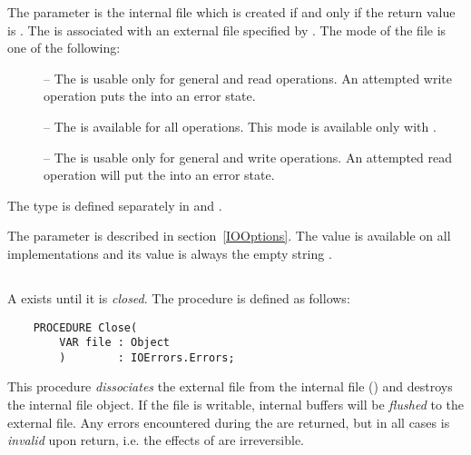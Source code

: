 The parameter  is the internal file which is created
if and only if the return value is .  The
 is associated with an external file specified
by .   The mode of the file is one of the following:

\begin{description}
\item[] --
    The  is usable only for general and read operations.
    An attempted write operation puts the  into an error state.

\item[] --
    The  is available for all operations.
    This mode is available only with .
    
\item[] --
    The  is usable only for general and write operations.
    An attempted read operation will put the  into an error state.
\end{description}

The type  is defined separately in 
and .

The  parameter is described in section~\ref{IOOptions}.
The value  is available on all implementations
and its value is always the empty string .


\subsection{}

A  exists until it is {\em closed}.  The procedure 
is defined as follows:

\begin{verbatim}
    PROCEDURE Close(
        VAR file : Object
        )        : IOErrors.Errors;
\end{verbatim}

This procedure {\em dissociates} the external file from the internal
file () and destroys the internal file object.  If the
file is writable, internal buffers will be {\em flushed} to the external
file.  Any errors encountered during the  are returned,
but in all cases  is {\em invalid} upon return, i.e.
the effects of  are irreversible.


